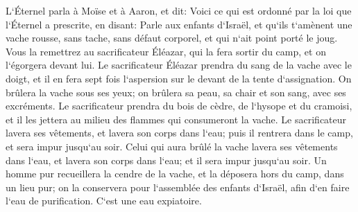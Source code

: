 \verse L`Éternel parla à Moïse et à Aaron, et dit: 
\verse Voici ce qui est ordonné par la loi que l`Éternel a prescrite, en disant: Parle aux enfants d`Israël, et qu`ils t`amènent une vache rousse, sans tache, sans défaut corporel, et qui n`ait point porté le joug. 
\verse Vous la remettrez au sacrificateur Éléazar, qui la fera sortir du camp, et on l`égorgera devant lui. 
\verse Le sacrificateur Éléazar prendra du sang de la vache avec le doigt, et il en fera sept fois l`aspersion sur le devant de la tente d`assignation. 
\verse On brûlera la vache sous ses yeux; on brûlera sa peau, sa chair et son sang, avec ses excréments. 
\verse Le sacrificateur prendra du bois de cèdre, de l`hysope et du cramoisi, et il les jettera au milieu des flammes qui consumeront la vache. 
\verse Le sacrificateur lavera ses vêtements, et lavera son corps dans l`eau; puis il rentrera dans le camp, et sera impur jusqu`au soir. 
\verse Celui qui aura brûlé la vache lavera ses vêtements dans l`eau, et lavera son corps dans l`eau; et il sera impur jusqu`au soir. 
\verse Un homme pur recueillera la cendre de la vache, et la déposera hors du camp, dans un lieu pur; on la conservera pour l`assemblée des enfants d`Israël, afin d`en faire l`eau de purification. C`est une eau expiatoire. 
